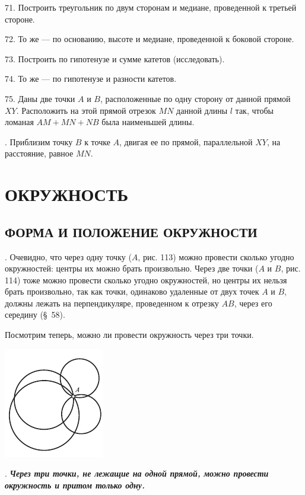 \documentclass[oneside]{book}
\begin{document}
71.
Построить треугольник по двум сторонам и медиане, проведенной к третьей стороне.

72.
То же — по основанию, высоте и медиане, проведенной к боковой стороне.

73.
Построить  по гипотенузе и сумме катетов (исследовать).

74.
То же — по гипотенузе и разности катетов.

75.
Даны две точки $A$ и $B$, расположенные по одну сторону от данной прямой $XY$.
Расположить на этой прямой отрезок $MN$ данной длины $l$ так, чтобы ломаная $AM+MN+NB$ была наименьшей длины.

.
Приблизим точку $B$ к точке $A$, двигая ее по прямой, параллельной $XY$, на расстояние, равное $MN$.



\chapter{ОКРУЖНОСТЬ}

\section{ФОРМА И ПОЛОЖЕНИЕ ОКРУЖНОСТИ}

.
Очевидно, что через одну точку ($A$, рис. 113) можно провести сколько угодно окружностей:
центры их можно брать произвольно.
Через две точки ($A$ и $B$, рис. 114) тоже можно провести сколько угодно окружностей, но центры их нельзя брать произвольно, так как точки, одинаково удаленные от двух точек $A$ и $B$, должны лежать на перпендикуляре, проведенном к отрезку $AB$, через его середину (§~58).

Посмотрим теперь, можно ли провести окружность через три точки.

\includegraphics{pics/ris-113}

.
\textbf{\emph{Через три точки, не лежащие на одной прямой, можно провести окружность и притом только одну.}}
\end{document}
